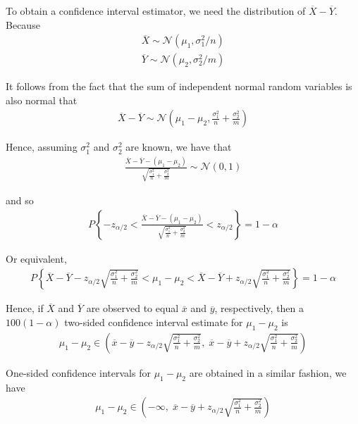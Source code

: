 \documentclass[12pt]{article}
\begin{document}
To obtain a confidence interval estimator, we need the distribution of $\overline{X} - \overline{Y}$. Because
\begin{eqnarray*}
  \overline{X} \sim \mathcal{N} (\mu_1, \sigma_1^2 / n) \\
  \overline{Y} \sim \mathcal{N} (\mu_2, \sigma_2^2 / m)
\end{eqnarray*}

It follows from the fact that the sum of independent normal random variables is also normal that
\begin{eqnarray*}
  \overline{X} - \overline{Y} \sim \mathcal{N} (\mu_1 - \mu_2,
  \frac{\sigma_1^2}{n} + \frac{\sigma_2^2}{m})
\end{eqnarray*}

Hence, assuming $\sigma_1^2$ and $\sigma_2^2$ are known, we have that
\begin{eqnarray*}
  \frac {\overline{X} - \overline{Y} - (\mu_1 - \mu_2)}
  {\sqrt {\frac{\sigma_1^2}{n} + \frac{\sigma_2^2}{m}}}
  \sim \mathcal{N} (0,1)
\end{eqnarray*}

and so
\begin{eqnarray*}
  P \left\{ -z_{\alpha/2} <
      \frac {\overline{X} - \overline{Y} - (\mu_1 - \mu_2)}
      {\sqrt {\frac{\sigma_1^2}{n} + \frac{\sigma_2^2}{m}}}
      < z_{\alpha/2} \right\} = 1 - \alpha
\end{eqnarray*}

Or equivalent,
\begin{eqnarray*}
  P \left\{ \overline{X} - \overline{Y}
    - z_{\alpha/2} \sqrt {\frac{\sigma_1^2}{n} + \frac{\sigma_2^2}{m}}
    < \mu_1 - \mu_2
    < \overline{X} - \overline{Y}
      + z_{\alpha/2} \sqrt {\frac{\sigma_1^2}{n} + \frac{\sigma_2^2}{m}}
    \right\} = 1 - \alpha
\end{eqnarray*}

Hence, if $\overline{X}$ and $\overline{Y}$ are observed to equal $\overline{x}$ and $\overline{y}$, respectively, then a $100(1 - \alpha)$ two-sided confidence interval estimate for $\mu_1 - \mu_2$ is
\begin{eqnarray*}
  \mu_1 - \mu_2 \in
  \left( \overline{x} - \overline{y}
    - z_{\alpha/2} \sqrt {\frac{\sigma_1^2}{n} + \frac{\sigma_2^2}{m}}, \;
    \overline{x} - \overline{y}
      + z_{\alpha/2} \sqrt {\frac{\sigma_1^2}{n} + \frac{\sigma_2^2}{m}}
    \right)
\end{eqnarray*}

One-sided confidence intervals for $\mu_1 - \mu_2$ are obtained in a similar fashion, we have
\begin{eqnarray*}
  \mu_1 - \mu_2 \in
  \left( - \infty, \; \overline{x} - \overline{y}
      + z_{\alpha/2} \sqrt {\frac{\sigma_1^2}{n} + \frac{\sigma_2^2}{m}}
    \right)
\end{eqnarray*}
\end{document}
